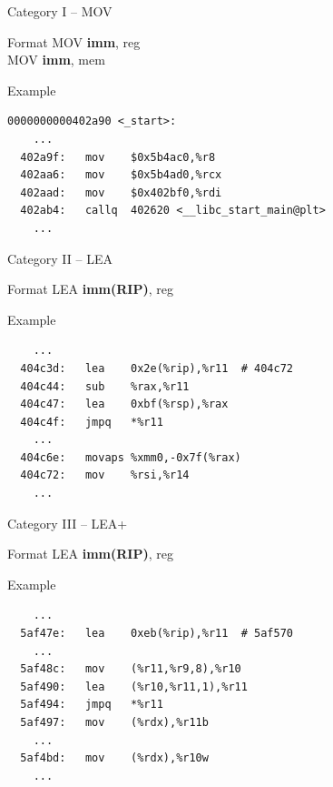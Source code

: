 \documentclass{beamer}
\begin{document}
\begin{frame}[fragile]{Category I -- MOV}
    \begin{block}{Format}
        MOV \textbf{imm}, reg \\
        MOV \textbf{imm}, mem
    \end{block}

    \begin{exampleblock}{Example}
        \begin{verbatim}
0000000000402a90 <_start>:
    ...
  402a9f:	mov    $0x5b4ac0,%r8
  402aa6:	mov    $0x5b4ad0,%rcx
  402aad:	mov    $0x402bf0,%rdi
  402ab4:	callq  402620 <__libc_start_main@plt>
    ...
        \end{verbatim}
    \end{exampleblock}
\end{frame}

\begin{frame}[fragile]{Category II -- LEA}
    \begin{block}{Format}
        LEA \textbf{imm(RIP)}, reg
    \end{block}

    \begin{exampleblock}{Example}
        \begin{verbatim}
    ...
  404c3d:	lea    0x2e(%rip),%r11  # 404c72 
  404c44:	sub    %rax,%r11
  404c47:	lea    0xbf(%rsp),%rax
  404c4f:	jmpq   *%r11
    ...
  404c6e:	movaps %xmm0,-0x7f(%rax)
  404c72:	mov    %rsi,%r14
    ...
        \end{verbatim}
    \end{exampleblock}
\end{frame}

\begin{frame}[fragile]{Category III -- LEA+}
    \begin{block}{Format}
        LEA \textbf{imm(RIP)}, reg
    \end{block}

    \begin{exampleblock}{Example}
        \begin{verbatim}
    ...
  5af47e:	lea    0xeb(%rip),%r11  # 5af570
    ...
  5af48c:	mov    (%r11,%r9,8),%r10
  5af490:	lea    (%r10,%r11,1),%r11
  5af494:	jmpq   *%r11
  5af497:	mov    (%rdx),%r11b
    ...
  5af4bd:	mov    (%rdx),%r10w
    ...
        \end{verbatim}
    \end{exampleblock}
\end{frame}
\end{document}
